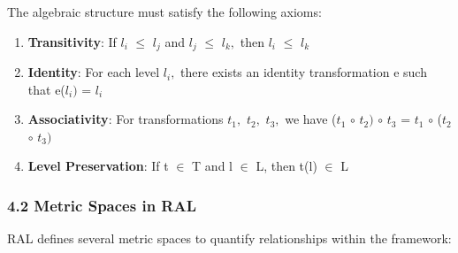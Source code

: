 \documentclass[
]{article}
\providecommand{\tightlist}{%
  \setlength{\itemsep}{0pt}\setlength{\parskip}{0pt}}
\begin{document}
The algebraic structure must satisfy the following axioms:

\begin{enumerate}
\def\labelenumi{\arabic{enumi}.}
\tightlist
\item
  \textbf{Transitivity}: If \(l_{i}\) \(\leq \) \(l_{j}\) and \(l_{j}\)
  \(\leq \) \(l_{k},\) then \(l_{i}\) \(\leq \) \(l_{k}\)
\item
  \textbf{Identity}: For each level \(l_{i},\) there exists an identity
  transformation e such that e(\(l_{i})\) = \(l_{i}\)
\item
  \textbf{Associativity}: For transformations \(t_{1},\) \(t_{2},\)
  \(t_{3},\) we have (\(t_{1}\) \(\circ \) \(t_{2})\) \(\circ \)
  \(t_{3}\) = \(t_{1}\) \(\circ \) (\(t_{2}\) \(\circ \) \(t_{3})\)
\item
  \textbf{Level Preservation}: If t \(\in \) T and l \(\in \) L, then
  t(l) \(\in \) L
\end{enumerate}

\subsubsection{4.2 Metric Spaces in RAL}\label{metric-spaces-in-ral}

RAL defines several metric spaces to quantify relationships within the
framework:
\end{document}
